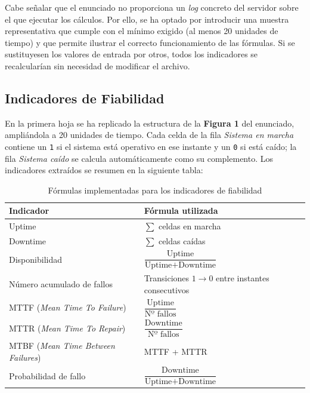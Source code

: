 \documentclass{article}
\begin{document}
Cabe señalar que el enunciado no proporciona un \textit{log} concreto del servidor sobre
el que ejecutar los cálculos. Por ello, se ha optado por introducir una muestra
representativa que cumple con el mínimo exigido (al menos 20 unidades de tiempo) y que
permite ilustrar el correcto funcionamiento de las fórmulas. Si se sustituyesen los
valores de entrada por otros, todos los indicadores se recalcularían sin necesidad de
modificar el archivo.

\subsection{Indicadores de Fiabilidad}

En la primera hoja se ha replicado la estructura de la \textbf{Figura 1} del enunciado,
ampliándola a 20 unidades de tiempo. Cada celda de la fila \textit{Sistema en marcha}
contiene un \texttt{1} si el sistema está operativo en ese instante y un \texttt{0} si
está caído; la fila \textit{Sistema caído} se calcula automáticamente como su complemento.
Los indicadores extraídos se resumen en la siguiente tabla:

\begin{table}[H]
    \centering
    \small
    \begin{tabular}{ll}
        \toprule
        \textbf{Indicador}            & \textbf{Fórmula utilizada}                                  \\
        \midrule
        Uptime                        & $\sum$ celdas en marcha                                     \\
        Downtime                      & $\sum$ celdas caídas                                        \\
        Disponibilidad                & $\dfrac{\text{Uptime}}{\text{Uptime} + \text{Downtime}}$    \\[6pt]
        Número acumulado de fallos    & Transiciones $1 \rightarrow 0$ entre instantes consecutivos \\
        MTTF (\textit{Mean Time To Failure})  & $\dfrac{\text{Uptime}}{\text{Nº fallos}}$           \\[6pt]
        MTTR (\textit{Mean Time To Repair})   & $\dfrac{\text{Downtime}}{\text{Nº fallos}}$         \\[6pt]
        MTBF (\textit{Mean Time Between Failures}) & MTTF + MTTR                                    \\
        Probabilidad de fallo         & $\dfrac{\text{Downtime}}{\text{Uptime} + \text{Downtime}}$  \\
        \bottomrule
    \end{tabular}
    \caption{Fórmulas implementadas para los indicadores de fiabilidad}
    \label{tab:formulas_fiabilidad}
\end{table}
\end{document}
